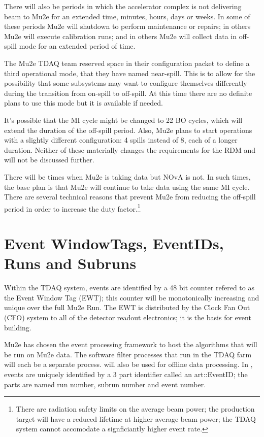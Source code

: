 There will also be periods in which the accelerator complex is not delivering
beam to Mu2e for an extended time, minutes, hours, days or weeks.
In some of these periods Mu2e will shutdown to perform maintenance or repairs;
in others Mu2e will execute calibration runs;
and in others Mu2e will collect data in off-spill mode for an extended period of time.

The Mu2e TDAQ team reserved space in their configuration packet to define
a third operational mode, that they have named near-spill.
This is to allow for the possibility that some subsystems may want to
configure themselves differently during the transition from on-spill to off-spill.
At this time there are no definite plans to use this mode but it is available if needed.

It's possible that the MI cycle might be changed to 22 BO cycles, which
will extend the duration of the off-spill period.
Also, Mu2e plans to start operations with a slightly different configuration:
4 spills instead of 8, each of a longer duration.
Neither of these materially changes the requirements for the RDM and
will not be discussed further.

There will be times when Mu2e is taking data but NOvA is not.
In such times, the base plan is that Mu2e will continue to take data using the same MI cycle.
There are several technical reasons that prevent Mu2e from reducing the off-spill period
in order to increase the duty factor.\footnote{
There are radiation safety limits on the average beam power;
the production target will have a reduced lifetime at higher average beam power;
the TDAQ system cannot accomodate a signficiantly higher event rate.
}

\section{Event WindowTags, EventIDs, Runs and Subruns}
\label{sec:TagsIDsRunsSubRuns}

Within the TDAQ system, events are identified by a 48 bit counter refered
to as the Event Window Tag (EWT);
this counter will be monotonically increasing and unique over the full Mu2e Run.
The EWT is distributed by the Clock Fan Out (CFO) system to all of the detector
readout electronics; it is the basis for event building.

Mu2e has chosen the \art event processing framework to host the algorithms
that will be run on Mu2e data.  The software filter processes that run
in the TDAQ farm will each be a separate \art process.  \art will also
be used for offline data processing.
In \art, events are uniquely identified by a 3 part identifier called an
{\code art::EventID}; the parts are named run number, subrun number
and event number.


